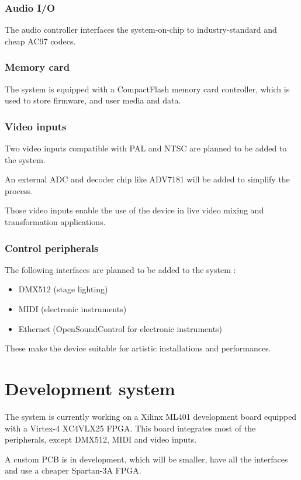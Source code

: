 \documentclass[a4paper,11pt,twocolumn]{paper}
\begin{document}
\subsubsection{Audio I/O}
The audio controller interfaces the system-on-chip to industry-standard and cheap AC97 codecs.

\subsubsection{Memory card}
The system is equipped with a CompactFlash memory card controller, which is used to store firmware, and user media and data.

\subsubsection{Video inputs}
Two video inputs compatible with PAL and NTSC are planned to be added to the system. 

An external ADC and decoder chip like ADV7181 will be added to simplify the process.

Those video inputs enable the use of the device in live video mixing and transformation applications.

\subsubsection{Control peripherals}
The following interfaces are planned to be added to the system :
\begin{itemize}
\item DMX512 (stage lighting)
\item MIDI (electronic instruments)
\item Ethernet (OpenSoundControl for electronic instruments)
\end{itemize}

These make the device suitable for artistic installations and performances.

\section{Development system}
The system is currently working on a Xilinx ML401 development board equipped with a Virtex-4 XC4VLX25 FPGA. This board integrates most of the peripherals, except DMX512, MIDI and video inputs.

A custom PCB is in development, which will be smaller, have all the interfaces and use a cheaper Spartan-3A FPGA.
\end{document}
